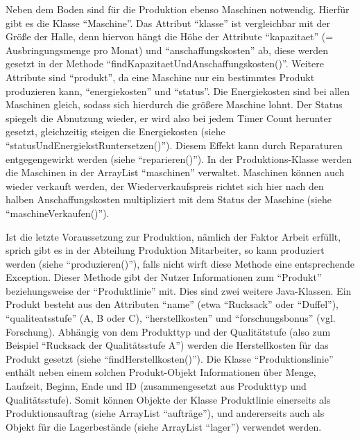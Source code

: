 Neben dem Boden sind für die Produktion ebenso Maschinen notwendig. Hierfür gibt es die Klasse \enquote{Maschine}. Das Attribut \enquote{klasse} ist vergleichbar mit der Größe der Halle, denn hiervon hängt die Höhe der Attribute \enquote{kapazitaet} (= Ausbringungsmenge pro Monat) und \enquote{anschaffungskosten} ab, diese werden gesetzt in der Methode \enquote{findKapazitaetUndAnschaffungskosten()}. Weitere Attribute sind \enquote{produkt}, da eine Maschine nur ein bestimmtes Produkt produzieren kann, \enquote{energiekosten} und \enquote{status}. Die Energiekosten sind bei allen Maschinen gleich, sodass sich hierdurch die größere Maschine lohnt. Der Status spiegelt die Abnutzung wieder, er wird also bei jedem Timer Count herunter gesetzt, gleichzeitig steigen die Energiekosten (siehe \enquote{statusUndEnergiekstRuntersetzen()}). Diesem Effekt kann durch Reparaturen entgegengewirkt werden (siehe \enquote{reparieren()}). In der Produktions-Klasse werden die Maschinen in der ArrayList \enquote{maschinen} verwaltet. Maschinen können auch wieder verkauft werden, der Wiederverkaufspreis richtet sich hier nach den halben Anschaffungskosten multipliziert mit dem Status der Maschine (siehe \enquote{maschineVerkaufen()}).

Ist die letzte Voraussetzung zur Produktion, nämlich der Faktor Arbeit erfüllt, sprich gibt es in der Abteilung Produktion Mitarbeiter, so kann produziert werden (siehe \enquote{produzieren()}), falls nicht wirft diese Methode eine entsprechende Exception. Dieser Methode gibt der Nutzer Informationen zum \enquote{Produkt} beziehungsweise der \enquote{Produktlinie} mit. Dies sind zwei weitere Java-Klassen. Ein Produkt besteht aus den Attributen \enquote{name} (etwa \enquote{Rucksack} oder \enquote{Duffel}), \enquote{qualiteatsstufe} (A, B oder C), \enquote{herstellkosten} und \enquote{forschungsbonus} (vgl. Forschung). Abhängig von dem Produkttyp und der Qualitätstufe (also zum Beispiel \enquote{Rucksack der Qualitätsstufe A}) werden die Herstellkosten für das Produkt gesetzt (siehe \enquote{findHerstellkosten()}). Die Klasse \enquote{Produktionslinie} enthält neben einem solchen Produkt-Objekt Informationen über Menge, Laufzeit, Beginn, Ende und ID (zusammengesetzt aus Produkttyp und Qualitätsstufe). Somit können Objekte der Klasse Produktlinie einerseits als Produktionsauftrag (siehe ArrayList \enquote{aufträge}), und andererseits auch als Objekt für die Lagerbestände (siehe ArrayList \enquote{lager}) verwendet werden.

